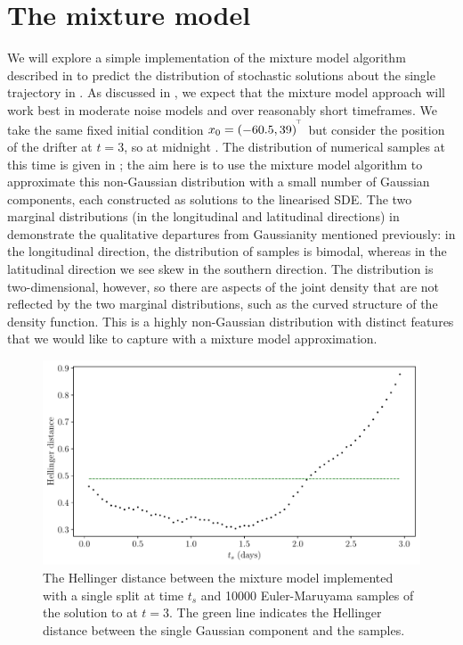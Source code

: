 \section{The mixture model}
We will explore a simple implementation of the mixture model algorithm described in  to predict the distribution of stochastic solutions about the single trajectory in .
As discussed in , we expect that the mixture model approach will work best in moderate noise models and over reasonably short timeframes.
We take the same fixed initial condition \(x_0 = \left(-60.5, 39\right)^{^{\!\top}}\) but consider the position of the drifter at \(t = 3\), so at midnight .
The distribution of numerical samples at this time is given in ; the aim here is to use the mixture model algorithm to approximate this non-Gaussian distribution with a small number of Gaussian components, each constructed as solutions to the linearised SDE.
The two marginal distributions (in the longitudinal and latitudinal directions) in  demonstrate the qualitative departures from Gaussianity mentioned previously: in the longitudinal direction, the distribution of samples is bimodal, whereas in the latitudinal direction we see skew in the southern direction.
The distribution is two-dimensional, however, so there are aspects of the joint density that are not reflected by the two marginal distributions, such as the curved structure of the density function.
This is a highly non-Gaussian distribution with distinct features that we would like to capture with a mixture model approximation.

\begin{figure}
	\centering
	\includegraphics[width=\textwidth]{chp06_applications/figures/gulf_stream/hell_dist_split}
	\caption{The Hellinger distance between the mixture model implemented with a single split at time \(t_s\) and 10000 Euler-Maruyama samples of the solution to  at \(t = 3\).
		The green line indicates the Hellinger distance between the single Gaussian component and the samples.}
	\label{fig:na_1split_hell}
\end{figure}

